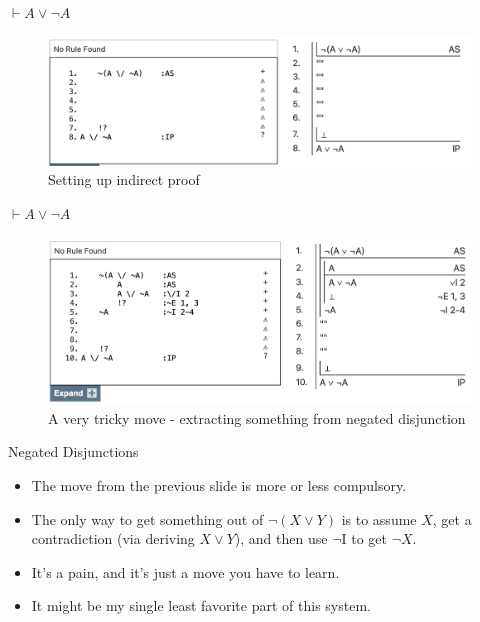 \documentclass[
  ignorenonframetext,
]{beamer}
\providecommand{\tightlist}{%
  \setlength{\itemsep}{0pt}\setlength{\parskip}{0pt}}
\renewcommand{\,}{\text{, }}
\begin{document}
\begin{frame}{\(\vdash A \vee \neg A\)}
\protect\hypertarget{vdash-a-vee-neg-a-1}{}
\begin{figure}
\centering
\includegraphics[width=\textwidth,height=0.75\textheight]{5_6q.png}
\caption{Setting up indirect proof}
\end{figure}
\end{frame}

\begin{frame}{\(\vdash A \vee \neg A\)}
\protect\hypertarget{vdash-a-vee-neg-a-2}{}
\begin{figure}
\centering
\includegraphics[width=\textwidth,height=0.75\textheight]{5_6r.png}
\caption{A very tricky move - extracting something from negated
disjunction}
\end{figure}
\end{frame}

\begin{frame}{Negated Disjunctions}
\protect\hypertarget{negated-disjunctions}{}
\begin{itemize}
\tightlist
\item
  The move from the previous slide is more or less compulsory.
\item
  The only way to get something out of \(\neg(X \vee Y)\) is to assume
  \(X\), get a contradiction (via deriving \(X \vee Y\)), and then use
  \(\neg\)I to get \(\neg X\).
\item
  It's a pain, and it's just a move you have to learn.
\item
  It might be my single least favorite part of this system.
\end{itemize}
\end{frame}
\end{document}
